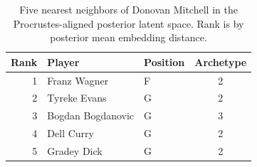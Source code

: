 \begin{table}[htbp]
  \centering\small
  \begin{tabular}{rllc}
    \toprule
    Rank & Player & Position & Archetype \\
    \midrule
    1 & Franz Wagner & F & 2 \\
    2 & Tyreke Evans & G & 2 \\
    3 & Bogdan Bogdanovic & G & 3 \\
    4 & Dell Curry & G & 2 \\
    5 & Gradey Dick & G & 2 \\
    \bottomrule
  \end{tabular}
  \caption{Five nearest neighbors of Donovan Mitchell in the Procrustes-aligned posterior latent space. Rank is by posterior mean embedding distance.}
  \label{tab:Donovan_Mitchell_neighbors}
\end{table}

